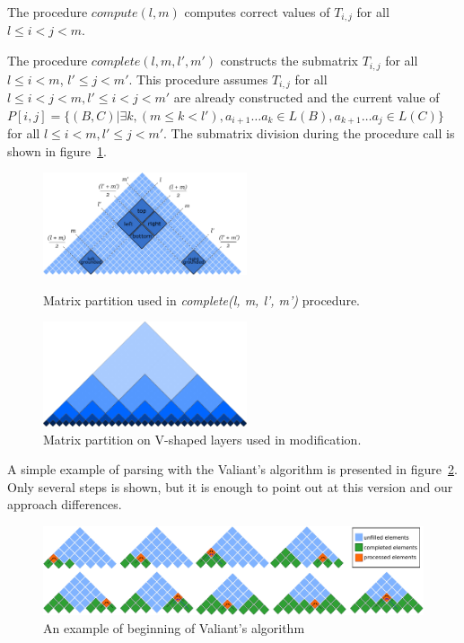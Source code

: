 The procedure $compute(l, m)$ computes correct values of $T_{i,j}$ for all $l \le i < j < m$.

The procedure $complete(l, m, l', m')$ constructs the submatrix $T_{i, j}$ for all $l \le i < m$, $l' \le j < m'$. This procedure assumes $T_{i, j}$ for all $l \leq i < j < m,  l' \leq i < j < m'$ are already constructed and the current value of  $P[i, j] =  \{ (B, C) |\exists k, (m \le k < l'), a_{i + 1} \dots a_{k} \in L(B), a_{k + 1} \dots a_{j} \in L(C)\}$ for all $l \leq i < m,  l' \leq j < m'$. The submatrix division during the procedure call is shown in figure~\ref{fig2}.


\begin{figure}
\vspace{3mm}
 \begin{center}
    \begin{minipage}{0.48\textwidth}
        \centering
        \includegraphics[width=6cm]{pictures/splitting_with_grounded.pdf}
        \caption{Matrix partition used in \textit{complete(l, m, l', m')} procedure.}
        \label{fig1}
    \end{minipage}\hfill
    \begin{minipage}{0.48\textwidth}
        \centering
        \includegraphics[width=6cm]{pictures/layers.pdf}
        \caption{Matrix partition on V-shaped layers used in modification.}
        \label{fig2}
    \end{minipage}
 \end{center}
\vspace{-8mm}
\end{figure}

A simple example of parsing with the Valiant's algorithm is presented in figure~\ref{fig3}.
Only several steps is shown, but it is enough to point out at this version and our approach differences.

\begin{figure}
\vspace{3mm}
 \begin{center}
 \includegraphics[width=12cm]{pictures/valbeg2.pdf}
    \caption{An example of beginning of Valiant's algorithm}
    \label{fig3}
\end{center}
\vspace{-8mm}
\end{figure}